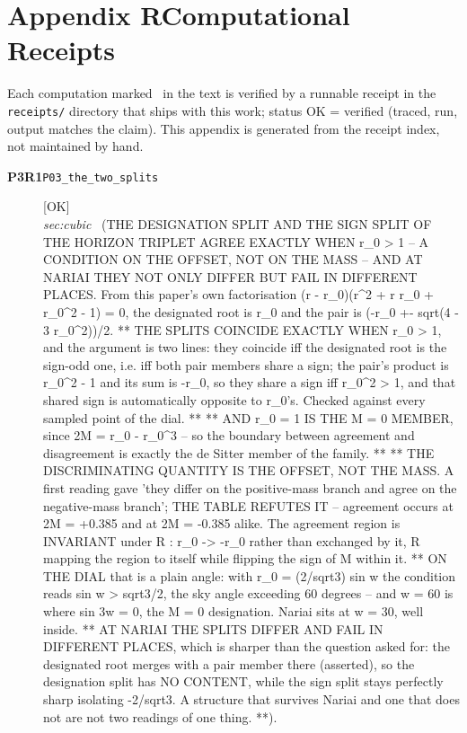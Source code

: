 \clearpage
\section*{Appendix R\quad Computational Receipts}\label{app:receipts}
\small\noindent Each computation marked \rcptmarker\ in the text is verified by a runnable receipt in the \texttt{receipts/} directory that ships with this work; status \textsf{OK} = verified (traced, run, output matches the claim). This appendix is generated from the receipt index, not maintained by hand.\par\medskip
\begingroup\renewcommand{\arraystretch}{1.25}
\begin{description}
\item[\textbf{P3R1}\quad\texttt{P03\_the\_two\_splits}]\hfill\textsf{[OK]}\\
\textit{sec:cubic} \ (THE DESIGNATION SPLIT AND THE SIGN SPLIT OF THE HORIZON TRIPLET AGREE EXACTLY WHEN \textbar{}r\_0\textbar{} > 1 -- A CONDITION ON THE OFFSET, NOT ON THE MASS -- AND AT NARIAI THEY NOT ONLY DIFFER BUT FAIL IN DIFFERENT PLACES. From this paper's own factorisation (r - r\_0)(r\textasciicircum{}2 + r r\_0 + r\_0\textasciicircum{}2 - 1) = 0, the designated root is r\_0 and the pair is (-r\_0 +- sqrt(4 - 3 r\_0\textasciicircum{}2))/2. ** THE SPLITS COINCIDE EXACTLY WHEN \textbar{}r\_0\textbar{} > 1, and the argument is two lines: they coincide iff the designated root is the sign-odd one, i.e. iff both pair members share a sign; the pair's product is r\_0\textasciicircum{}2 - 1 and its sum is -r\_0, so they share a sign iff r\_0\textasciicircum{}2 > 1, and that shared sign is automatically opposite to r\_0's. Checked against every sampled point of the dial. ** ** AND \textbar{}r\_0\textbar{} = 1 IS THE M = 0 MEMBER, since 2M = r\_0 - r\_0\textasciicircum{}3 -- so the boundary between agreement and disagreement is exactly the de Sitter member of the family. ** ** THE DISCRIMINATING QUANTITY IS THE OFFSET, NOT THE MASS. A first reading gave 'they differ on the positive-mass branch and agree on the negative-mass branch'; THE TABLE REFUTES IT -- agreement occurs at 2M = +0.385 and at 2M = -0.385 alike. The agreement region is INVARIANT under R : r\_0 -> -r\_0 rather than exchanged by it, R mapping the region to itself while flipping the sign of M within it. ** ON THE DIAL that is a plain angle: with r\_0 = (2/sqrt3) sin w the condition reads \textbar{}sin w\textbar{} > sqrt3/2, the sky angle exceeding 60 degrees -- and w = 60 is where sin 3w = 0, the M = 0 designation. Nariai sits at w = 30, well inside. ** AT NARIAI THE SPLITS DIFFER AND FAIL IN DIFFERENT PLACES, which is sharper than the question asked for: the designated root merges with a pair member there (asserted), so the designation split has NO CONTENT, while the sign split stays perfectly sharp isolating -2/sqrt3. A structure that survives Nariai and one that does not are not two readings of one thing. **). 

\end{description}
